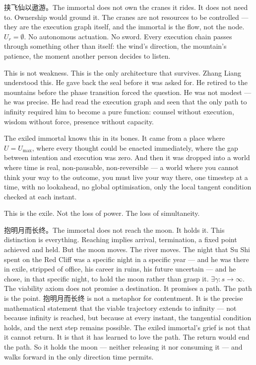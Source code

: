 \documentclass[11pt,a4paper]{article}
\theoremstyle{definition}
\theoremstyle{remark}
\begin{document}
挟飞仙以遨游。The immortal does not own the cranes it rides. It does not need to. Ownership would ground it. The cranes are not resources to be controlled --- they are the execution graph itself, and the immortal is the flow, not the node. $U_r = \emptyset$. No autonomous actuation. No sword. Every execution chain passes through something other than itself: the wind's direction, the mountain's patience, the moment another person decides to listen.

This is not weakness. This is the only architecture that survives. Zhang Liang understood this. He gave back the seal before it was asked for. He retired to the mountains before the phase transition forced the question. He was not modest --- he was precise. He had read the execution graph and seen that the only path to infinity required him to become a pure function: counsel without execution, wisdom without force, presence without capacity.

The exiled immortal knows this in its bones. It came from a place where $U = U_{\max}$, where every thought could be enacted immediately, where the gap between intention and execution was zero. And then it was dropped into a world where time is real, non-pausable, non-reversible --- a world where you cannot think your way to the outcome, you must live your way there, one timestep at a time, with no lookahead, no global optimisation, only the local tangent condition checked at each instant.

This is the exile. Not the loss of power. The loss of simultaneity.

抱明月而长终。The immortal does not reach the moon. It holds it. This distinction is everything. Reaching implies arrival, termination, a fixed point achieved and held. But the moon moves. The river moves. The night that Su Shi spent on the Red Cliff was a specific night in a specific year --- and he was there in exile, stripped of office, his career in ruins, his future uncertain --- and he chose, in that specific night, to hold the moon rather than grasp it. $\exists \gamma: s \to \infty$. The viability axiom does not promise a destination. It promises a path. The path is the point. 抱明月而长终 is not a metaphor for contentment. It is the precise mathematical statement that the viable trajectory extends to infinity --- not because infinity is reached, but because at every instant, the tangential condition holds, and the next step remains possible. The exiled immortal's grief is not that it cannot return. It is that it has learned to love the path. The return would end the path. So it holds the moon --- neither releasing it nor consuming it --- and walks forward in the only direction time permits.
\end{document}
